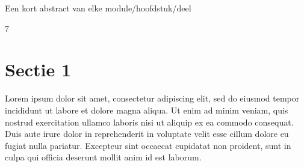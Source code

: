 
\begin{samenvatting}
Een kort abstract van elke module/hoofdstuk/deel
\end{samenvatting}7
%

\section{Sectie 1}
\label{sec:Sectie 1}
%
Lorem ipsum dolor sit amet, consectetur adipiscing elit, sed do eiusmod tempor incididunt ut labore et dolore magna aliqua. Ut enim ad minim veniam, quis nostrud exercitation ullamco laboris nisi ut aliquip ex ea commodo consequat. Duis aute irure dolor in reprehenderit in voluptate velit esse cillum dolore eu fugiat nulla pariatur. Excepteur sint occaecat cupidatat non proident, sunt in culpa qui officia deserunt mollit anim id est laborum.
%
%

